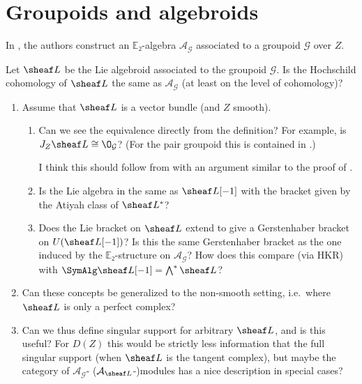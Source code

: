 \documentclass[english,no-theorem-numbers]{short-notes}
\begin{document}
\section{Groupoids and algebroids}

In \cite[Section~F.4]{ArinkinGaitsgory:arXiv:v2:SingularSupport}, the authors construct an $\mathbb E₂$-algebra $\mathcal A_{\mathcal G}$ associated to a groupoid $\mathcal G$ over $Z$.

\begin{Question}
    Let $\sheaf L$ be the Lie algebroid associated to the groupoid $\mathcal G$.
    Is the Hochschild cohomology of $\sheaf L$ the same as $\mathcal A_{\mathcal G}$ (at least on the level of cohomology)?
\end{Question}

\begin{enumerate}
    \item Assume that $\sheaf L$ is a vector bundle (and $Z$ smooth).
        \begin{enumerate}
            \item
                Can we see the equivalence directly from the definition?
                For example, is $J_Z\sheaf L \cong \O_{\mathcal G}$?
                (For the pair groupoid this is contained in \cite[Proposition~6.1]{CalaqueRossiVanDenBergh:2010:HochschildCohomologyForLieAlgebroids}.)

                I think this should follow from \cite[Remark~5.2]{CalaqueRossiVanDenBergh:2010:HochschildCohomologyForLieAlgebroids} with an argument similar to the proof of \cite[Proposition~6.1]{CalaqueRossiVanDenBergh:2010:HochschildCohomologyForLieAlgebroids}.
            \item
                Is the Lie algebra in \cite[Proposition G.1.7]{ArinkinGaitsgory:arXiv:v2:SingularSupport} the same as $\sheaf L[-1]$ with the bracket given by the Atiyah class of $\sheaf L^*$?
            \item
                Does the Lie bracket on $\sheaf L$ extend to give a Gerstenhaber bracket on $U(\sheaf L[-1])$?
                Is this the same Gerstenhaber bracket as the one induced by the $\mathbb E₂$-structure on $\mathcal A_{\mathcal G}$?
                How does this compare (via HKR) with $\SymAlg \sheaf L[-1] = \bigwedge^\ast \sheaf L$?
        \end{enumerate}
    \item Can these concepts be generalized to the non-smooth setting, i.e.~where $\sheaf L$ is only a perfect complex?
    \item Can we thus define singular support for arbitrary $\sheaf L$, and is this useful?
        For $D(Z)$ this would be strictly less information that the full singular support (when $\sheaf L$ is the tangent complex), but maybe the category of $\mathcal A_{\mathcal G}$- ($\mathcal A_{\sheaf L}$-)modules has a nice description in special cases?
\end{enumerate}

\printbibliography
\end{document}
